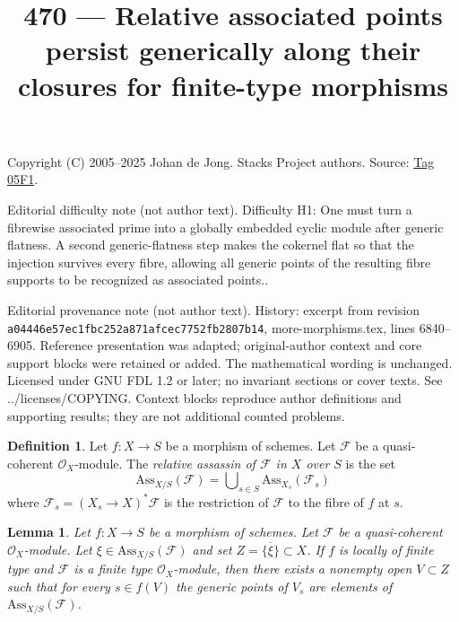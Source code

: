 \documentclass{amsart}
\theoremstyle{plain}
\newtheorem{lemma}[subsection]{Lemma}
\theoremstyle{definition}
\newtheorem{definition}[subsection]{Definition}
\theoremstyle{remark}
\numberwithin{equation}{subsection}
\begin{document}
\title[Stacks Project, Tag 05F1]{470 --- Relative associated points persist generically along their closures for finite-type morphisms}
\maketitle
\noindent Copyright (C) 2005--2025 Johan de Jong. Stacks Project authors. Source: \href{https://stacks.math.columbia.edu/tag/05F1}{Tag 05F1}.

\noindent Editorial difficulty note (not author text). Difficulty H1: One must turn a fibrewise associated prime into a globally embedded cyclic module after generic flatness. A second generic-flatness step makes the cokernel flat so that the injection survives every fibre, allowing all generic points of the resulting fibre supports to be recognized as associated points..

\noindent Editorial provenance note (not author text). History: excerpt from revision \texttt{a0444\allowbreak 6e57e\allowbreak c1fbc\allowbreak 252a8\allowbreak 71afc\allowbreak ec775\allowbreak 2fb28\allowbreak 07b14}, more-morphisms.tex, lines 6840--6905. Reference presentation was adapted; original-author context and core support blocks were retained or added. The mathematical wording is unchanged. Licensed under GNU FDL 1.2 or later; no invariant sections or cover texts. See ../licenses/COPYING. Context blocks reproduce author definitions and supporting results; they are not additional counted problems.

\begin{definition}
\label{divisors-definition-relative-assassin}
Let $f : X \to S$ be a morphism of schemes.
Let $\mathcal{F}$ be a quasi-coherent $\mathcal{O}_X$-module.
The {\it relative assassin of $\mathcal{F}$ in $X$ over $S$}
is the set
$$
\text{Ass}_{X/S}(\mathcal{F}) =
\bigcup\nolimits_{s \in S} \text{Ass}_{X_s}(\mathcal{F}_s)
$$
where $\mathcal{F}_s = (X_s \to X)^*\mathcal{F}$ is the restriction
of $\mathcal{F}$ to the fibre of $f$ at $s$.
\end{definition}

\begin{lemma}
\label{lemma-relative-assassin-in-neighbourhood}
Let $f : X \to S$ be a morphism of schemes.
Let $\mathcal{F}$ be a quasi-coherent $\mathcal{O}_X$-module.
Let $\xi \in \text{Ass}_{X/S}(\mathcal{F})$ and set
$Z = \overline{\{\xi\}} \subset X$.
If $f$ is locally of finite type and $\mathcal{F}$ is a
finite type $\mathcal{O}_X$-module, then there exists a nonempty
open $V \subset Z$ such that for every $s \in f(V)$ the generic
points of $V_s$ are elements of $\text{Ass}_{X/S}(\mathcal{F})$.
\end{lemma}
\end{document}
